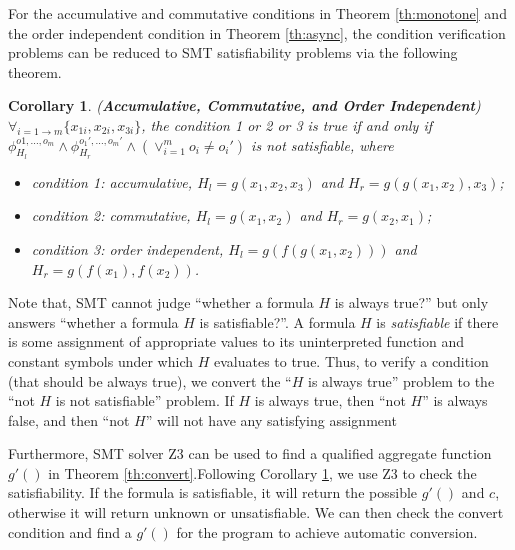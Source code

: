 For the accumulative and commutative conditions in Theorem \ref{th:monotone} and the order independent condition in Theorem \ref{th:async}, the condition verification problems can be reduced to SMT satisfiability problems via the following theorem.

\newtheorem{corollary}{Corollary}
\begin{corollary}
	\label{coro:auto:1}
	(\textbf{Accumulative, Commutative, and Order Independent}) $\forall_{i=1\to m} \{x_{1i},x_{2i},x_{3i}\}$, the condition 1 or 2 or 3 is true if and only if $\phi_{H_l}^{o1,\ldots,o_m}\wedge \phi_{H_r}^{o_1',\ldots,o_m'}\wedge (\vee_{i=1}^m{o_i\neq o_i'})$ is not satisfiable, where
	\begin{itemize}
		\item condition 1: accumulative, $H_l=g(x_1,x_2,x_3)$ and $H_r=g(g(x_1,x_2),x_3)$;
		\item condition 2: commutative, $H_l=g(x_1,x_2)$ and $H_r=g(x_2,x_1)$;
		\item condition 3: order independent, $H_l=g(f(g(x_1,x_2)))$ and $H_r=g(f(x_1),f(x_2))$.
	\end{itemize}
\end{corollary}

Note that, SMT cannot judge ``whether a formula $H$ is always true?'' but only answers ``whether a formula $H$ is satisfiable?''. A formula $H$ is \emph{satisfiable} if there is some assignment of appropriate values to its uninterpreted function and constant symbols under which $H$ evaluates to true. Thus, to verify a condition (that should be always true), we convert the ``$H$ is always true'' problem to the ``not $H$ is not satisfiable'' problem. If $H$ is always true, then ``not $H$'' is always false, and then ``not $H$'' will not have any satisfying assignment


Furthermore, SMT solver Z3 can be used to find a qualified aggregate function $g'()$ in Theorem \ref{th:convert}.Following Corollary \ref{coro:auto:1}, we use Z3 to check the satisfiability. If the formula is satisfiable, it will return the possible $g'()$ and $c$, otherwise it will return unknown or unsatisfiable. We can then check the convert condition and find a $g'()$ for the program to achieve automatic conversion.
